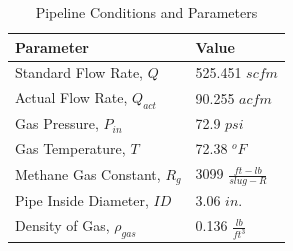 \documentclass[12pt]{article}
\begin{document}
\begin{table}[ht]
\label{table:parameters}
\begin{center}
\caption{Pipeline Conditions and Parameters}
\vspace{0.1in}
\begin{tabular}{ll}
\hline
\hline
Parameter & Value  \\
\hline
Standard Flow Rate, $Q$ & 525.451 $scfm$ \\
Actual Flow Rate, $Q_{act}$ & 90.255 $acfm$ \\
Gas Pressure, $P_{in}$ & 72.9 $psi$  \\
Gas Temperature, $T$ & 72.38 $^o F$ \\
Methane Gas Constant, $R_{g}$  & 3099 $\frac{ft-lb}{slug-R}$ \\
Pipe Inside Diameter, $ID$ & 3.06 $in.$ \\
Density of Gas, $\rho_{gas}$ & 0.136 $\frac{lb}{ft^3}$ \\[1ex]
\end{tabular}
\end{center}
\end{table}
\end{document}
